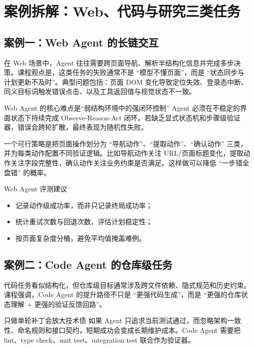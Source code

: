 \section{案例拆解：Web、代码与研究三类任务}

\subsection{案例一：Web Agent 的长链交互}
在 Web 场景中，Agent 往往需要跨页面导航、解析半结构化信息并完成多步决策。课程观点是，这类任务的失败通常不是 ``模型不懂页面''，而是 ``状态同步与计划更新不及时''。典型问题包括：页面 DOM 变化导致定位失效、登录态中断、同义目标词触发错误点击、以及工具返回值与视觉状态不一致。

\begin{importantbox}{Web Agent 的核心难点是“弱结构环境中的强闭环控制”}
Agent 必须在不稳定的界面状态下持续完成 Observe-Reason-Act 闭环。若缺乏显式状态机和步骤级验证器，错误会跨轮扩散，最终表现为随机性失败。
\end{importantbox}

一个可行策略是把页面操作划分为 ``导航动作''、``提取动作''、``确认动作'' 三类，并为每类动作配置不同验证逻辑。比如导航动作关注 URL/页面标题变化，提取动作关注字段完整性，确认动作关注业务约束是否满足。这样做可以降低 ``一步错全盘错'' 的概率。

\begin{knowledgebox}{Web Agent 评测建议}
\begin{itemize}
    \item 记录动作级成功率，而非只记录终局成功率；
    \item 统计重试次数与回退次数，评估计划稳定性；
    \item 按页面复杂度分桶，避免平均值掩盖难例。
\end{itemize}
\end{knowledgebox}

\subsection{案例二：Code Agent 的仓库级任务}
代码任务看似结构化，但仓库级目标通常涉及跨文件依赖、隐式规范和历史约束。课程强调，Code Agent 的提升路径不只是 ``更强代码生成''，而是 ``更强的仓库状态理解 + 更强的验证反馈回路''。

\begin{warningbox}{只做单轮补丁会放大技术债}
如果 Agent 只追求当前测试通过，而忽略架构一致性、命名规则和接口契约，短期成功会变成长期维护成本。Code Agent 需要把 lint、type check、unit test、integration test 联合作为验证器。
\end{warningbox}

